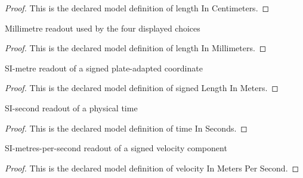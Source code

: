 \begin{proof}
  This is the declared model definition of length In Centimeters.
\end{proof}
\begin{definition}
  \label{def:physics:phyx-mini-0838:phyxminiproblems-problemphyxmini0838-lengthinmillimeters}
  Millimetre readout used by the four displayed choices
\end{definition}
\begin{proof}
  This is the declared model definition of length In Millimeters.
\end{proof}
\begin{definition}
  \label{def:physics:phyx-mini-0838:phyxminiproblems-problemphyxmini0838-signedlengthinmeters}
  SI-metre readout of a signed plate-adapted coordinate
\end{definition}
\begin{proof}
  This is the declared model definition of signed Length In Meters.
\end{proof}
\begin{definition}
  \label{def:physics:phyx-mini-0838:phyxminiproblems-problemphyxmini0838-timeinseconds}
  SI-second readout of a physical time
\end{definition}
\begin{proof}
  This is the declared model definition of time In Seconds.
\end{proof}
\begin{definition}
  \label{def:physics:phyx-mini-0838:phyxminiproblems-problemphyxmini0838-velocityinmeterspersecond}
  SI-metres-per-second readout of a signed velocity component
\end{definition}
\begin{proof}
  This is the declared model definition of velocity In Meters Per Second.
\end{proof}
